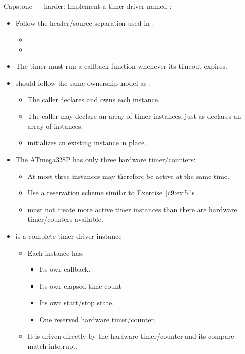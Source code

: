 \label{c9:ex:6}
Capstone --- harder: Implement a timer driver named :
\begin{itemize}
  \item Follow the header/source separation used in :
  \begin{itemize}
    \item {}
    \item {}
  \end{itemize}
  \item The timer must run a callback function whenever its timeout expires.
  \item {} should follow the same ownership model as :
  \begin{itemize}
    \item The caller declares and owns each  instance.
    \item The caller may declare an array of timer instances, just as  declares an
      array of  instances.
    \item {} initializes an existing instance in place.
  \end{itemize}
  \item The ATmega328P has only three hardware timer/counters:
  \begin{itemize}
    \item At most three  instances may therefore be active at the same time.
    \item Use a reservation scheme similar to Exercise~\ref{c9:ex:5}'s .
    \item {} must not create more active timer instances than there are hardware
      timer/counters available.
  \end{itemize}
  \item {} is a complete timer driver instance:
  \begin{itemize}
    \item Each instance has:
    \begin{itemize}
      \item Its own callback.
      \item Its own elapsed-time count.
      \item Its own start/stop state.
      \item One reserved hardware timer/counter.
    \end{itemize}
    \item It is driven directly by the hardware timer/counter and its compare-match interrupt.
  \end{itemize}
\end{itemize}

